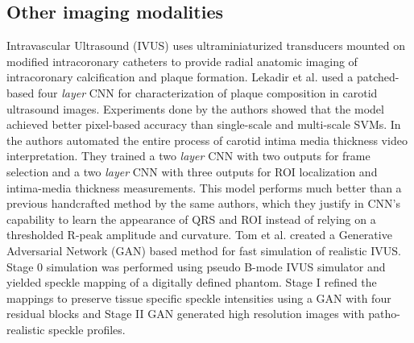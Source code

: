 \documentclass[journal]{IEEEtran}
\begin{document}
\subsection{Other imaging modalities}
Intravascular Ultrasound (IVUS) uses ultraminiaturized transducers mounted on modified intracoronary catheters to provide radial anatomic imaging of intracoronary calcification and plaque formation\cite{parrillo2013critical}.
Lekadir et al.\cite{lekadir2017convolutional} used a patched-based four \textit{layer} CNN for characterization of plaque composition in carotid ultrasound images.
Experiments done by the authors showed that the model achieved better pixel-based accuracy than single-scale and multi-scale SVMs.
In\cite{tajbakhsh2017automatic} the authors automated the entire process of carotid intima media thickness video interpretation.
They trained a two \textit{layer} CNN with two outputs for frame selection and a two \textit{layer} CNN with three outputs for ROI localization and intima-media thickness measurements.
This model performs much better than a previous handcrafted method by the same authors, which they justify in CNN's capability to learn the appearance of QRS and ROI instead of relying on a thresholded R-peak amplitude and curvature.
Tom et al.\cite{tom2018simulating} created a Generative Adversarial Network (GAN) based method for fast simulation of realistic IVUS\@.
Stage 0 simulation was performed using pseudo B-mode IVUS simulator and yielded speckle mapping of a digitally defined phantom.
Stage I refined the mappings to preserve tissue specific speckle intensities using a GAN with four residual blocks and Stage II GAN generated high resolution images with patho-realistic speckle profiles.
\end{document}
